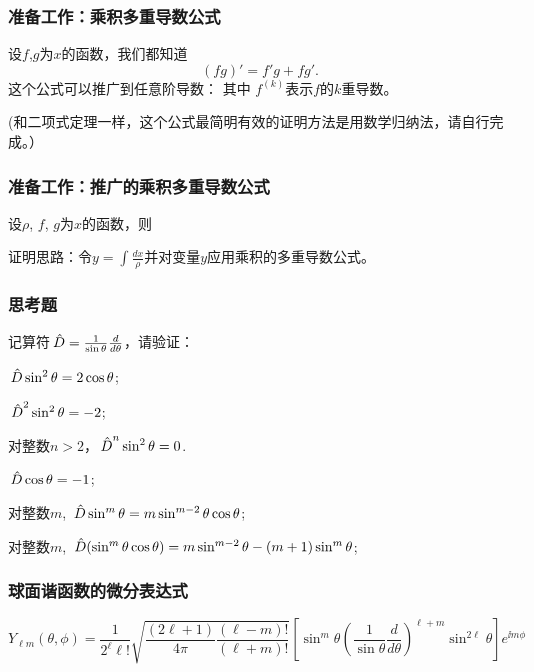 \documentclass[CJK]{beamer}
\begin{document}
\begin{frame}
  \frametitle{准备工作：乘积多重导数公式}
  
  设$f$,$g$为$x$的函数，我们都知道
  $$ (fg)' = f'g + fg'. $$
  这个公式可以推广到任意阶导数：
  其中 $f^{(k)}$表示$f$的$k$重导数。

  \skipline
  {\small \darkgreen (和二项式定理一样，这个公式最简明有效的证明方法是用数学归纳法，请自行完成。）}
  
\end{frame}


\begin{frame}
  \frametitle{准备工作：推广的乘积多重导数公式}
  
  设$\rho$, $f$, $g$为$x$的函数，则

  \skipline
  
  {\small \darkgreen 证明思路：令$y = \int \frac{dx}{\rho}$并对变量$y$应用乘积的多重导数公式。}
  
  
\end{frame}


\begin{frame}
\frametitle{思考题}

记算符${\,\hat{D}} = \frac{1}{\sin\theta}\frac{d}{d\theta}$，请验证：
\bitem
\item{${\,\hat{D}}\sin^2\theta = 2\cos\theta$;}
\item{${\,\hat{D}}^2\sin^2\theta = -2$;}
\item{对整数$n>2$，${\,\hat{D}}^n \sin^2\theta = 0$.}  
\item{${\,\hat{D}}\cos\theta = -1$;}
\item{对整数$m$, ${\,\hat{D}} \sin^m\theta = m \sin^{m-2}\theta \cos\theta$;}
\item{对整数$m$, ${\,\hat{D}} (\sin^m\theta\cos\theta) =m\sin^{m-2}\theta - (m+1)\sin^m\theta$;}  
\eitem
  

\end{frame}




\begin{frame}
  \frametitle{球面谐函数的微分表达式}
  

  {\small \blue
    $$ Y_{\ell m}(\theta,\phi) =\frac{1}{2^\ell \ell !}\sqrt{\frac{(2\ell+1)}{4\pi} \frac{(\ell-m)!}{(\ell+m)!}}\left[\sin^m\theta \left(\frac{1}{\sin\theta}\frac{d}{d\theta}\right)^{\ell+m}\sin^{2\ell}\theta \right] e^{\ii m\phi}$$}

  
\end{frame}
\end{document}
